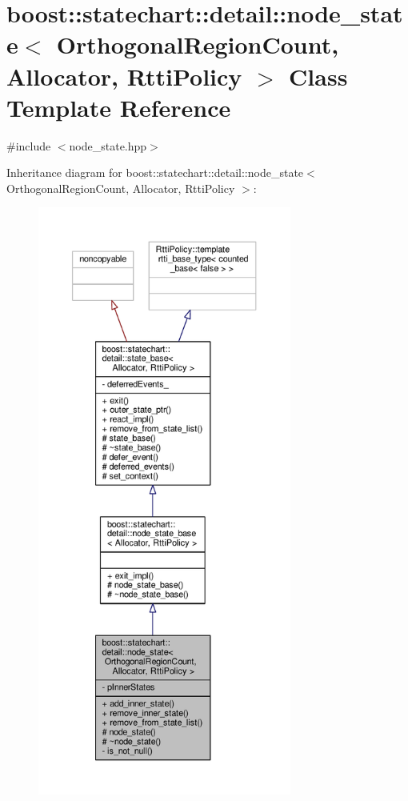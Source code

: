 \hypertarget{classboost_1_1statechart_1_1detail_1_1node__state}{}\section{boost\+:\+:statechart\+:\+:detail\+:\+:node\+\_\+state$<$ Orthogonal\+Region\+Count, Allocator, Rtti\+Policy $>$ Class Template Reference}
\label{classboost_1_1statechart_1_1detail_1_1node__state}


{\ttfamily \#include $<$node\+\_\+state.\+hpp$>$}



Inheritance diagram for boost\+:\+:statechart\+:\+:detail\+:\+:node\+\_\+state$<$ Orthogonal\+Region\+Count, Allocator, Rtti\+Policy $>$\+:
\nopagebreak
\begin{figure}[H]
\begin{center}
\leavevmode
\includegraphics[height=550pt]{classboost_1_1statechart_1_1detail_1_1node__state__inherit__graph}
\end{center}
\end{figure}


